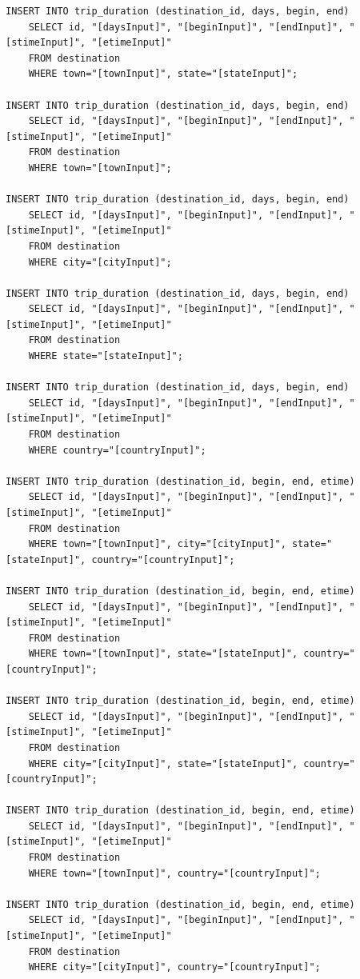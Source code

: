 \documentclass[letterpaper,10pt,onecolumn,compsoc]{IEEEtran}
\begin{document}
\begin{verbatim}
INSERT INTO trip_duration (destination_id, days, begin, end) 
	SELECT id, "[daysInput]", "[beginInput]", "[endInput]", "[stimeInput]", "[etimeInput]" 
	FROM destination 
	WHERE town="[townInput]", state="[stateInput]";
	
INSERT INTO trip_duration (destination_id, days, begin, end) 
	SELECT id, "[daysInput]", "[beginInput]", "[endInput]", "[stimeInput]", "[etimeInput]" 
	FROM destination 
	WHERE town="[townInput]";
	
INSERT INTO trip_duration (destination_id, days, begin, end) 
	SELECT id, "[daysInput]", "[beginInput]", "[endInput]", "[stimeInput]", "[etimeInput]" 
	FROM destination 
	WHERE city="[cityInput]";
	
INSERT INTO trip_duration (destination_id, days, begin, end) 
	SELECT id, "[daysInput]", "[beginInput]", "[endInput]", "[stimeInput]", "[etimeInput]" 
	FROM destination 
	WHERE state="[stateInput]";
	
INSERT INTO trip_duration (destination_id, days, begin, end) 
	SELECT id, "[daysInput]", "[beginInput]", "[endInput]", "[stimeInput]", "[etimeInput]" 
	FROM destination 
	WHERE country="[countryInput]";

INSERT INTO trip_duration (destination_id, begin, end, etime) 
	SELECT id, "[daysInput]", "[beginInput]", "[endInput]", "[stimeInput]", "[etimeInput]" 
	FROM destination 
	WHERE town="[townInput]", city="[cityInput]", state="[stateInput]", country="[countryInput]";
	
INSERT INTO trip_duration (destination_id, begin, end, etime) 
	SELECT id, "[daysInput]", "[beginInput]", "[endInput]", "[stimeInput]", "[etimeInput]" 
	FROM destination 
	WHERE town="[townInput]", state="[stateInput]", country="[countryInput]";
	
INSERT INTO trip_duration (destination_id, begin, end, etime) 
	SELECT id, "[daysInput]", "[beginInput]", "[endInput]", "[stimeInput]", "[etimeInput]" 
	FROM destination 
	WHERE city="[cityInput]", state="[stateInput]", country="[countryInput]";
	
INSERT INTO trip_duration (destination_id, begin, end, etime) 
	SELECT id, "[daysInput]", "[beginInput]", "[endInput]", "[stimeInput]", "[etimeInput]" 
	FROM destination 
	WHERE town="[townInput]", country="[countryInput]";
	
INSERT INTO trip_duration (destination_id, begin, end, etime) 
	SELECT id, "[daysInput]", "[beginInput]", "[endInput]", "[stimeInput]", "[etimeInput]" 
	FROM destination 
	WHERE city="[cityInput]", country="[countryInput]";
	

\end{verbatim}
\end{document}
